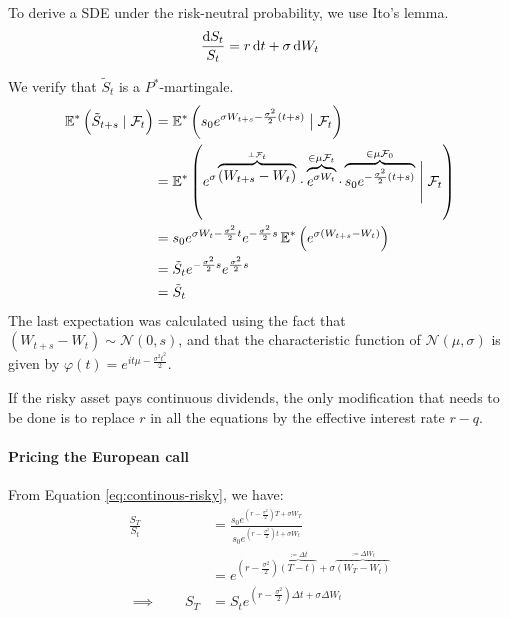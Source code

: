 To derive a SDE under the risk-neutral probability, we use Ito's lemma.
\begin{equation}
	\label{eq:continuous-risky-sde-risk-neutral}
	\frac{\dif S_t}{S_t} = r \dif t + \sigma \dif W_t
\end{equation}


We verify that $ \tilde{S}_t $ is a $ P^* $-martingale.
\begin{align*}
	\operatorname{\mathbb{E}}^* \left( \tilde{S}_{t+s} \mid \mathcal{F}_t \right)  &=  \operatorname{\mathbb{E}}^* \left( s_0 e^{\sigma W_{t+s} - \frac{\sigma^2}{2} (t+s) } \bigm| \mathcal{F}_t \right)  \\
	&=  \operatorname{\mathbb{E}}^* \left( e^{\sigma \overbrace{( W_{t+s} - W_{t} )}^{\perp \mathcal{F}_t} }
	\cdot  \overbrace{e^{ \sigma W_t}}^{\in \mu \mathcal{F}_t}
	\cdot  \overbrace{s_0 e^{- \frac{\sigma^2}{2} (t+s)}}^{\in \mu \mathcal{F}_0} \Biggm| \mathcal{F}_t \right)  \\
	&=  s_0 e^{ \sigma W_t - \frac{\sigma^2}{2} t } e^{ - \frac{\sigma^2}{2} s }  \operatorname{\mathbb{E}}^* \left( e^{\sigma ( W_{t+s} - W_{t} ) } \right)  \\
	&=  \tilde{S}_t e^{ - \frac{\sigma^2}{2} s } e^{ \frac{\sigma^2}{2} s }  \\
	&=  \tilde{S}_t
\end{align*}
The last expectation was calculated using the fact that $ ( W_{t+s} - W_{t} ) \sim \mathcal{N}(0, s) $, and that the characteristic function of $ \mathcal{N}(\mu, \sigma) $ is given by $ \varphi(t) = e^{it \mu - \frac{\sigma^2 t^2}{2}} $.


\begin{rem}
	\label{rem:continuous-dividend}
	If the risky asset pays continuous dividends, the only modification that needs to be done is to replace $ r $ in all the equations by the effective interest rate $ r - q $.
\end{rem}



\paragraph{Pricing the European call}
From Equation \ref{eq:continous-risky}, we have:
\begin{align*}
	\frac{S_T}{S_t}  &=  \frac{s_0 e^{ ( r - \frac{\sigma^2}{2} ) T + \sigma W_T }}{s_0 e^{ ( r - \frac{\sigma^2}{2} ) t + \sigma W_t }}  \\
	&=  e^{ ( r - \frac{\sigma^2}{2} ) \overbrace{( T-t )}^{\coloneqq \Delta t} + \sigma \overbrace{( W_T - W_t )}^{\coloneqq \Delta W_t} }  \\
	\implies  \qquad S_T  &=  S_t e^{ ( r - \frac{\sigma^2}{2} ) \Delta t + \sigma \Delta W_t }
\end{align*}

